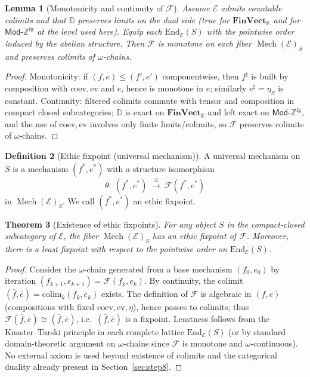 \documentclass[12pt]{article}
\DeclareMathOperator{\Mech}{Mech}
\newcommand{\FinVect}{\mathbf{FinVect}}
\newcommand{\E}{\mathcal{E}}
\newcommand{\Mod}{\mathsf{Mod}}
\newcommand{\ZZ}{\mathbb{Z}}
\newcommand{\DD}{\mathbb{D}}
\newcommand{\coev}{\mathrm{coev}}
\newcommand{\ev}{\mathrm{ev}}
\theoremstyle{plain}
\newtheorem{theorem}{Theorem}[section]
\newtheorem{lemma}[theorem]{Lemma}
\theoremstyle{definition}
\newtheorem{definition}[theorem]{Definition}
\theoremstyle{remark}
\numberwithin{equation}{section}
\begin{document}
\begin{lemma}[Monotonicity and continuity of $\mathcal F$]
Assume $\E$ admits countable colimits and that $\DD$ preserves limits on the dual side (true for $\FinVect_{\mathbb R}$ and for $\Mod\text{-}\ZZ^{\mathrm{fg}}$ at the level used here). Equip each $\mathrm{End}_\E(S)$ with the pointwise order induced by the abelian structure. Then $\mathcal F$ is monotone on each fiber $\Mech(\E)_S$ and preserves colimits of $\omega$-chains.
\end{lemma}

\begin{proof}
Monotonicity: if $(f,e)\le (f',e')$ componentwise, then $f^\sharp$ is built by composition with $\coev,\ev$ and $e$, hence is monotone in $e$; similarly $e^\sharp=\eta_S$ is constant. Continuity: filtered colimits commute with tensor and composition in compact closed subcategories; $\DD$ is exact on $\FinVect_{\mathbb R}$ and left exact on $\Mod\text{-}\ZZ^{\mathrm{fg}}$, and the use of $\coev,\ev$ involves only finite limits/colimits, so $\mathcal F$ preserves colimits of $\omega$-chains.
\end{proof}

\begin{definition}[Ethic fixpoint (universal mechanism)]
A universal mechanism on $S$ is a mechanism $(f^*,e^*)$ with a structure isomorphism
\[
\theta:\ (f^*,e^*) \;\xrightarrow{\ \cong\ }\ \mathcal F(f^*,e^*)
\]
in $\Mech(\E)_S$. We call $(f^*,e^*)$ an ethic fixpoint.
\end{definition}

\begin{theorem}[Existence of ethic fixpoints]\label{thm:existence-fixpoint}
For any object $S$ in the compact-closed subcategory of $\E$, the fiber $\Mech(\E)_S$ has an ethic fixpoint of $\mathcal F$. Moreover, there is a least fixpoint with respect to the pointwise order on $\mathrm{End}_\E(S)$.
\end{theorem}

\begin{proof}
Consider the $\omega$-chain generated from a base mechanism $(f_0,e_0)$ by iteration $(f_{k+1},e_{k+1})=\mathcal F(f_k,e_k)$. By continuity, the colimit $(\bar f,\bar e)=\mathrm{colim}_k (f_k,e_k)$ exists. The definition of $\mathcal F$ is algebraic in $(f,e)$ (compositions with fixed $\coev,\ev,\eta$), hence passes to colimits; thus $\mathcal F(\bar f,\bar e)\cong(\bar f,\bar e)$, i.e.\ $(\bar f,\bar e)$ is a fixpoint. Leastness follows from the Knaster–Tarski principle in each complete lattice $\mathrm{End}_\E(S)$ (or by standard domain-theoretic argument on $\omega$-chains since $\mathcal F$ is monotone and $\omega$-continuous). No external axiom is used beyond existence of colimits and the categorical duality already present in Section~\ref{sec:step8}.
\end{proof}
\end{document}
